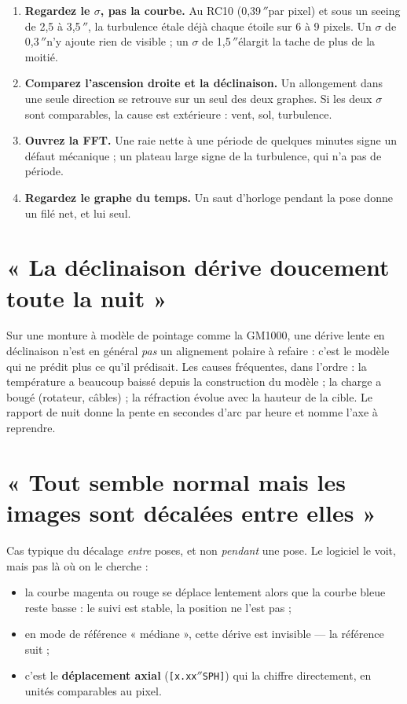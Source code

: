 \documentclass[a4paper,11pt,twoside]{report}
\newcommand{\arcsec}{\ensuremath{''}}
\begin{document}
\begin{enumerate}
\item \textbf{Regardez le $\sigma$, pas la courbe.} Au RC10
(0,39\,\arcsec par pixel) et sous un seeing de
2,5 à 3,5\,\arcsec, la turbulence étale déjà chaque étoile sur
6 à 9 pixels. Un $\sigma$ de 0,3\,\arcsec n'y ajoute rien de visible ;
un $\sigma$ de 1,5\,\arcsec élargit la tache de plus de la moitié.

\item \textbf{Comparez l'ascension droite et la déclinaison.} Un allongement
dans une seule direction se retrouve sur un seul des deux graphes. Si les
deux $\sigma$ sont comparables, la cause est extérieure : vent, sol,
turbulence.

\item \textbf{Ouvrez la FFT.} Une raie nette à une période de quelques minutes
signe un défaut mécanique ; un plateau large signe de la turbulence, qui n'a
pas de période.

\item \textbf{Regardez le graphe du temps.} Un saut d'horloge pendant la pose
donne un filé net, et lui seul.
\end{enumerate}

\section{« La déclinaison dérive doucement toute la nuit »}

\begin{tip}
Sur une monture à modèle de pointage comme la GM1000, une dérive lente en
déclinaison n'est en général \emph{pas} un alignement polaire à refaire :
c'est le modèle qui ne prédit plus ce qu'il prédisait. Les causes fréquentes,
dans l'ordre : la température a beaucoup baissé depuis la construction du
modèle ; la charge a bougé (rotateur, câbles) ; la réfraction évolue avec la
hauteur de la cible. Le rapport de nuit donne la pente en secondes d'arc par
heure et nomme l'axe à reprendre.
\end{tip}

\section{« Tout semble normal mais les images sont décalées entre elles »}

Cas typique du décalage \emph{entre} poses, et non \emph{pendant} une pose.
Le logiciel le voit, mais pas là où on le cherche :

\begin{itemize}
\item la courbe magenta ou rouge se déplace lentement alors que la courbe
bleue reste basse : le suivi est stable, la position ne l'est pas ;
\item en mode de référence « médiane », cette dérive est invisible --- la
référence suit ;
\item c'est le \textbf{déplacement axial} (\texttt{[x.xx\arcsec SPH]}) qui
la chiffre directement, en unités comparables au pixel.
\end{itemize}
\end{document}
